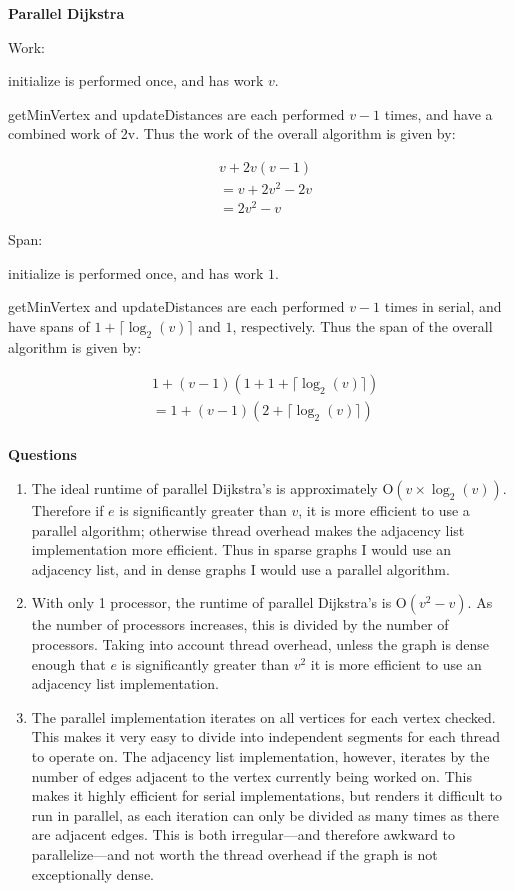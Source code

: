 \documentclass[12pt]{article}
\begin{document}
\vspace{.75cm}

\centerline{\textbf{Parallel Dijkstra}}

\noindent Work:

initialize is performed once, and has work $v$.

getMinVertex and updateDistances are each performed $v - 1$ times, and have a
combined work of 2v. Thus the work of the overall algorithm is given by:

\begin{align*}
  & v + 2v(v - 1) \\
  &= v + 2v^{2} - 2v \\
  &= 2v^{2} - v
\end{align*}
  
\noindent Span:

initialize is performed once, and has work $1$.

getMinVertex and updateDistances are each performed $v - 1$ times in serial, and
have spans of $1 + \lceil\log_{2}(v)\rceil$ and $1$, respectively. Thus the span
of the overall algorithm is given by:

\begin{align*}
  & 1 + (v - 1)(1 + 1 + \lceil\log_{2}(v)\rceil) \\
  &= 1 + (v - 1)(2 + \lceil\log_{2}(v)\rceil) \\
\end{align*}

\newpage

\centerline{\textbf{Questions}}

\begin{enumerate}
\item
  The ideal runtime of parallel Dijkstra's is approximately
  O$(v \times \log_{2}(v))$. Therefore if $e$ is significantly greater than $v$,
  it is more efficient to use a parallel algorithm; otherwise thread overhead
  makes the adjacency list implementation more efficient. Thus in sparse graphs I
  would use an adjacency list, and in dense graphs I would use a parallel
  algorithm.

\item
  With only 1 processor, the runtime of parallel Dijkstra's is O$(v^{2} - v)$. As
  the number of processors increases, this is divided by the number of processors.
  Taking into account thread overhead, unless the graph is dense enough that $e$
  is significantly greater than $v^{2}$ it is more efficient to use an adjacency
  list implementation.

\item
  The parallel implementation iterates on all vertices for each vertex checked.
  This makes it very easy to divide into independent segments for each thread
  to operate on. The adjacency list implementation, however, iterates by the
  number of edges adjacent to the vertex currently being worked on. This makes it
  highly efficient for serial implementations, but renders it difficult to run in
  parallel, as each iteration can only be divided as many times as there are
  adjacent edges. This is both irregular---and therefore awkward to
  parallelize---and not worth the thread overhead if the graph is not
  exceptionally dense.
  
\end{enumerate}
\end{document}
